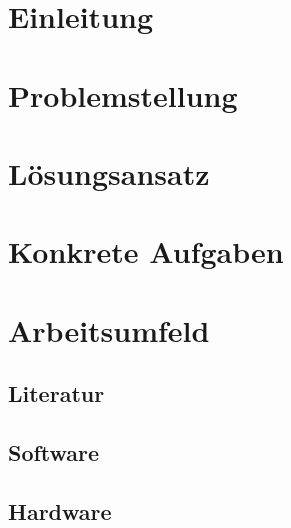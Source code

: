\documentclass[german,a4paper,12pt,parskip=half]{scrartcl}
\begin{document}
\section{Einleitung}
\label{sec:einleitung}

\section{Problemstellung}
\label{sec:problemstellung}

\section{Lösungsansatz}
\label{sec:loesungsansatz}

\section{Konkrete Aufgaben}
\label{sec:konkrete_aufgaben}

\section{Arbeitsumfeld}
\label{sec:arbeitsumfeld}

  \subsection{Literatur}
  \label{ssec:literatur}
  \nocite{Johnson:1997:FRA:262793.262799}
  

  \subsection{Software}
  \label{ssec:software}

  \subsection{Hardware}
  \label{ssec:hardware}
\end{document}
